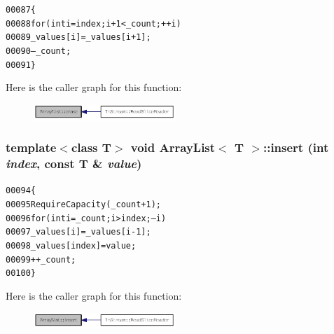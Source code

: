 \begin{footnotesize}\begin{alltt}
00087         \{
00088                 \textcolor{keywordflow}{for} (\textcolor{keywordtype}{int} i = index; i + 1 < \_count; ++i)
00089                         \_values[i] = \_values[i + 1];
00090                 --\_count;
00091         \}
\end{alltt}\end{footnotesize}




Here is the caller graph for this function:\nopagebreak
\begin{figure}[H]
\begin{center}
\leavevmode
\includegraphics[width=152pt]{class_array_list_a18695cf2c26e9c6ef585ec77afc19fc6_icgraph}
\end{center}
\end{figure}


\hypertarget{class_array_list_addb12a5554260fa1f386160ce8534db0}{
\subsubsection[{insert}]{\setlength{\rightskip}{0pt plus 5cm}template$<$class T$>$ void {\bf ArrayList}$<$ T $>$::insert (int {\em index}, \/  const T \& {\em value})}}
\label{class_array_list_addb12a5554260fa1f386160ce8534db0}




\begin{footnotesize}\begin{alltt}
00094         \{
00095                 RequireCapacity(\_count + 1);
00096                 \textcolor{keywordflow}{for} (\textcolor{keywordtype}{int} i = \_count; i > index; --i)
00097                         \_values[i] = \_values[i - 1];
00098                 \_values[index] = value;
00099                 ++\_count;
00100         \}
\end{alltt}\end{footnotesize}




Here is the caller graph for this function:\nopagebreak
\begin{figure}[H]
\begin{center}
\leavevmode
\includegraphics[width=152pt]{class_array_list_addb12a5554260fa1f386160ce8534db0_icgraph}
\end{center}
\end{figure}


